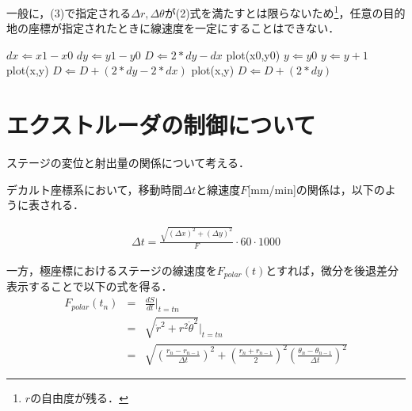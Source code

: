 \documentclass[twocolumn,oneside,a4paper]{article}
\begin{document}
一般に，(3)で指定される$\Delta r, \Delta \theta$が(2)式を満たすとは限らないため\footnote{$r$の自由度が残る．}，任意の目的地の座標が指定されたときに線速度を一定にすることはできない．

\begin{algorithm}                  
\begin{algorithmic}                  
\label{alg1}                          
\STATE $dx \Leftarrow x1-x0$
\STATE $dy \Leftarrow y1-y0$
\STATE $D \Leftarrow 2*dy - dx$
\STATE plot(x0,y0)
\STATE $y \Leftarrow y0$
\STATE      $y \Leftarrow y+1$
\STATE      plot(x,y)
\STATE      $D \Leftarrow D + (2*dy-2*dx)$
\ELSE
\STATE      plot(x,y)
\STATE      $D \Leftarrow D + (2*dy)$
\ENDIF
\ENDFOR
\end{algorithmic}
\end{algorithm}

\section{エクストルーダの制御について}
ステージの変位と射出量の関係について考える．

デカルト座標系において，移動時間$\Delta t$と線速度$F$[mm/min]の関係は，以下のように表される．

\begin{eqnarray*}
	\Delta t = \frac{\sqrt{(\Delta x)^2+(\Delta y)^2}}{F}\cdot 60\cdot1000
\end{eqnarray*}

一方，極座標におけるステージの線速度を$F_{polar}(t)$とすれば，微分を後退差分表示することで以下の式を得る．
\begin{eqnarray*}
F_{polar}(t_n) &=& \frac{d S}{d t}\Bigg|_{t=tn} \\
&=& \sqrt{\dot{r}^2+r^2 \dot{\theta}^2}\Big|_{t=tn} \\
&=& \sqrt{\left( \frac{r_n - r_{n-1}}{\Delta t} \right)^2 + \left(\frac{r_n+r_{n-1}}{2} \right)^2 \left( \frac{\theta_n - \theta_{n-1} }{\Delta t} \right)^2}	
\end{eqnarray*}
\end{document}
